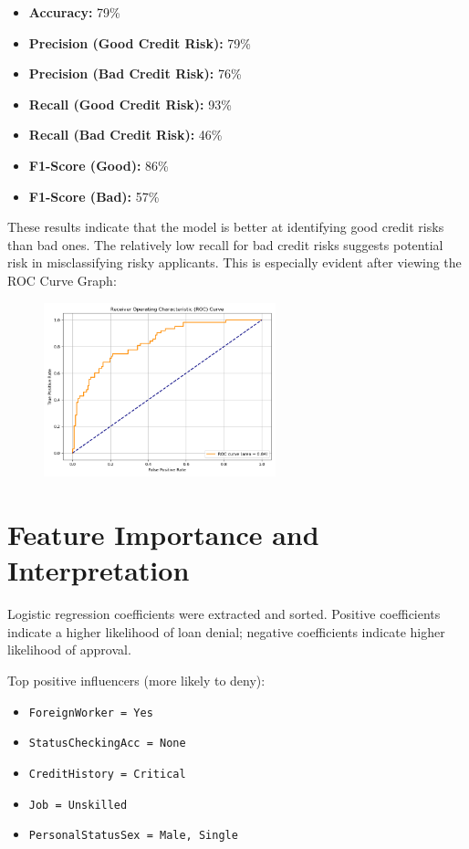 \documentclass[12pt]{article}
\begin{document}
	\begin{itemize}
		\item \textbf{Accuracy:} 79\%
		\item \textbf{Precision (Good Credit Risk):} 79\%
		\item \textbf{Precision (Bad Credit Risk):} 76\%
		\item \textbf{Recall (Good Credit Risk):} 93\%
		\item \textbf{Recall (Bad Credit Risk):} 46\%
		\item \textbf{F1-Score (Good):} 86\%
		\item \textbf{F1-Score (Bad):} 57\%
	\end{itemize}
	
	These results indicate that the model is better at identifying good credit risks than bad ones. The relatively low recall for bad credit risks suggests potential risk in misclassifying risky applicants. This is especially evident after viewing the ROC Curve Graph:
	
	\begin{figure}[h]
		\centering
		\includegraphics[width=0.6\textwidth]{ROCCurve.png}
	\end{figure}
	
	\section{Feature Importance and Interpretation}
	Logistic regression coefficients were extracted and sorted. Positive coefficients indicate a higher likelihood of loan denial; negative coefficients indicate higher likelihood of approval.
	
	Top positive influencers (more likely to deny):
	\begin{itemize}
		\item \texttt{ForeignWorker = Yes}
		\item \texttt{StatusCheckingAcc = None}
		\item \texttt{CreditHistory = Critical}
		\item \texttt{Job = Unskilled}
		\item \texttt{PersonalStatusSex = Male, Single}
	\end{itemize}
	
\end{document}
